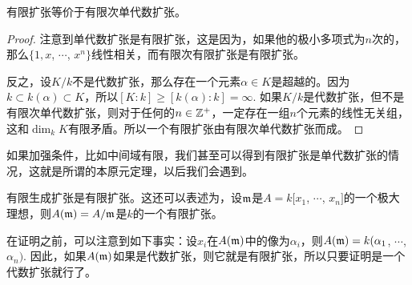 \begin{pro}
有限扩张等价于有限次单代数扩张。
\end{pro}

\begin{proof} 注意到单代数扩张是有限扩张，这是因为，如果他的极小多项式为$n$次的，那么$\{1,x$, $\cdots$, $x^n\}$线性相关，而有限次有限扩张是有限扩张。

反之，设$K/k$不是代数扩张，那么存在一个元素$\alpha\in K$是超越的。因为$k\subset k(\alpha)\subset K$，所以$[K:k]\geq [k(\alpha):k]=\infty$. 如果$K/k$是代数扩张，但不是有限次单代数扩张，则对于任何的$n\in \mathbb{Z}^+$，一定存在一组$n$个元素的线性无关组，这和$\dim_k K$有限矛盾。所以一个有限扩张由有限次单代数扩张而成。\end{proof}

如果加强条件，比如中间域有限，我们甚至可以得到有限扩张是单代数扩张的情况，这就是所谓的本原元定理，以后我们会遇到。

\begin{thm}[Zariski引理]
有限生成扩张是有限扩张。这还可以表述为，设$\mathfrak{m}$是$A=k[x_1$, $\cdots$, $x_n]$的一个极大理想，则$A(\mathfrak{m})=A/\mathfrak{m}$是$k$的一个有限扩张。
\end{thm}

在证明之前，可以注意到如下事实：设$x_i$在$A(\mathfrak{m})$中的像为$\alpha_i$，则$A(\mathfrak{m})=k(\alpha_1$, $\cdots$, $\alpha_n)$. 因此，如果$A(\mathfrak{m})$如果是代数扩张，则它就是有限扩张，所以只要证明是一个代数扩张就行了。

